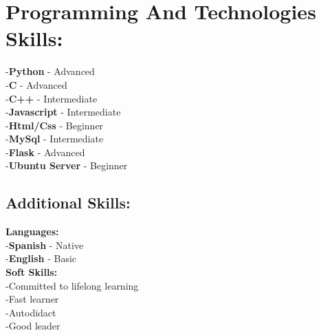 \documentclass{article}
\begin{document}
\begin{minipage}[t]{8cm}
\begin{itemize}
    \end{itemize}
\section*{Programming And Technologies Skills:}
        -\textbf{Python} - Advanced\\
        -\textbf{C} - Advanced\\
        -\textbf{C++} - Intermediate\\
        -\textbf{Javascript} - Intermediate \\
        -\textbf{Html/Css} - Beginner \\
        -\textbf{MySql} - Intermediate \\
        -\textbf{Flask} - Advanced \\
        -\textbf{Ubuntu Server} - Beginner

      \subsection*{Additional Skills:}
    \textbf{Languages:}\\
    -\textbf{Spanish} - Native\\
    -\textbf{English} - Basic \\
    \textbf{Soft Skills:}\\
    -Committed to lifelong learning \\
    -Fast learner\\
    -Autodidact\\
    -Good leader


\end{minipage}
\end{document}
